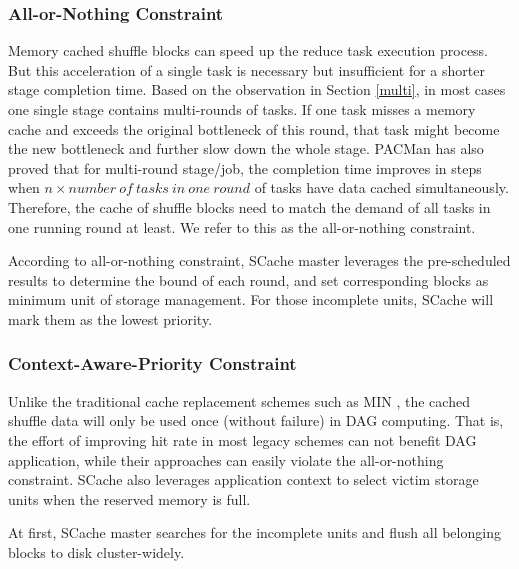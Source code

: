 \subsubsection{All-or-Nothing Constraint}
Memory cached shuffle blocks can speed up the reduce task execution process. But this acceleration of a single task is necessary but insufficient for a shorter stage completion time. Based on the observation in Section \ref{multi}, in most cases one single stage contains multi-rounds of tasks. If one task misses a memory cache and exceeds the original bottleneck of this round, that task might become the new bottleneck and further slow down the whole stage. PACMan \cite{pacman} has also proved that for multi-round stage/job, the completion time improves in steps when $n\times number\ of\ tasks\ in\ one\ round$ of tasks have data cached simultaneously. Therefore, the cache of shuffle blocks need to match the demand of all tasks in one running round at least. We refer to this as the all-or-nothing constraint.

According to all-or-nothing constraint, SCache master leverages the pre-scheduled results to determine the bound of each round, and set corresponding blocks as minimum unit of storage management.
For those incomplete units, SCache will mark them as the lowest priority.

\subsubsection{Context-Aware-Priority Constraint}
Unlike the traditional cache replacement schemes such as MIN \cite{min}, the cached shuffle data will only be used once (without failure) in DAG computing. That is, the effort of improving hit rate in most legacy schemes can not benefit DAG application, while their approaches can easily violate the all-or-nothing constraint.
SCache also leverages application context to select victim storage units when the reserved memory is full.

At first, SCache master searches for the incomplete units and flush all belonging blocks to disk cluster-widely.

